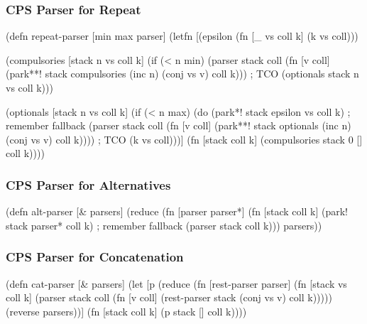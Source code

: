\documentclass{beamer}
\begin{document}
\begin{frame}[fragile]
\frametitle{CPS Parser for Repeat}

{\scriptsize
\begin{semiverbatim}
(defn repeat-parser [min max parser]
  (letfn [(epsilon (fn [_ vs coll k] (k vs coll)))

          (compulsories [stack n vs coll k]
            (if (< n min)
              (parser stack coll
                      (fn [v coll]
                        (park**! stack compulsories
                                 (inc n) (conj vs v) coll k))) ; TCO
              (optionals stack n vs coll k)))

          (optionals [stack n vs coll k]
            (if (< n max)
              (do
                (park*! stack epsilon vs coll k) ; remember fallback
                (parser stack coll
                        (fn [v coll]
                          (park**! stack optionals
                                   (inc n) (conj vs v) coll k)))) ; TCO
              (k vs coll)))]
    (fn [stack coll k] (compulsories stack 0 [] coll k))))
\end{semiverbatim}
}

\end{frame}


\begin{frame}[fragile]
\frametitle{CPS Parser for Alternatives}

{\scriptsize
\begin{semiverbatim}
(defn alt-parser [& parsers]
  (reduce (fn [parser parser*]
            (fn [stack coll k]
              (park! stack parser* coll k) ; remember fallback
              (parser stack coll k)))
          parsers))
\end{semiverbatim}
}

\end{frame}


\begin{frame}[fragile]
\frametitle{CPS Parser for Concatenation}

{\scriptsize
\begin{semiverbatim}
(defn cat-parser [& parsers]
  (let [p (reduce (fn [rest-parser parser]
                    (fn [stack vs coll k]
                      (parser stack coll
                              (fn [v coll]
                                (rest-parser stack (conj vs v) coll k)))))
                  (reverse parsers))]
    (fn [stack coll k] (p stack [] coll k))))
\end{semiverbatim}
}

\end{frame}
\end{document}
